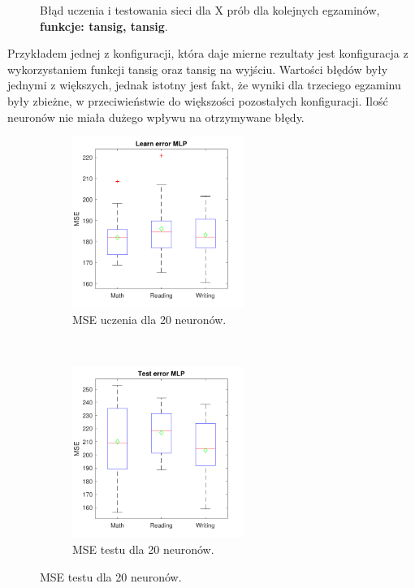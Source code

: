 \documentclass[12pt]{article}
\begin{document}
\begin{figure}[H]
\caption{Błąd uczenia i testowania sieci dla X prób dla kolejnych egzaminów, \textbf{funkcje: tansig, tansig}.}
\end{figure}
Przykładem jednej z konfiguracji, która daje mierne rezultaty jest konfiguracja z wykorzystaniem funkcji tansig oraz tansig na wyjściu. Wartości błędów były jednymi z większych, jednak istotny jest fakt, że wyniki dla trzeciego egzaminu były zbieżne, w przeciwieństwie do większości pozostałych konfiguracji. Ilość neuronów nie miała dużego wpływu na otrzymywane błędy.



\begin{figure}[H]
\centering
\begin{subfigure}[t]{0.48\textwidth} 
\centering
\includegraphics[height=2.2in]{tansig_purelin_20_learnBoxplot.pdf}
\caption{MSE uczenia dla 20 neuronów.}
\end{subfigure}
~~
\begin{subfigure}[t]{0.48\textwidth} 
\centering
\includegraphics[height=2.2in]{tansig_purelin_20_testBoxplot.pdf}
\caption{MSE testu dla 20 neuronów.}
\end{subfigure}


\end{figure}
\end{document}
